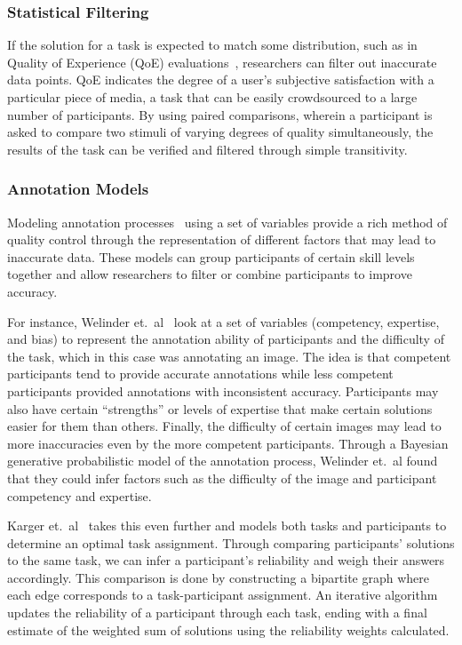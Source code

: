 \documentclass[10pt,twocolumn]{article}
\begin{document}
\subsubsection*{Statistical Filtering}
If the solution for a task is expected to match some distribution, 
such as in Quality of Experience (QoE) evaluations~\cite{Chen2009}, researchers 
can filter out inaccurate data points. QoE indicates the degree of a user's 
subjective satisfaction with a particular piece of media, a task 
that can be easily crowdsourced to a large number of participants. By using
paired comparisons, wherein a participant is asked to compare two 
stimuli of varying degrees of quality simultaneously, the results of the task 
can be verified and filtered through simple transitivity.


\subsubsection*{Annotation Models}

Modeling annotation processes~\cite{Karger,Welinder} using a set of variables 
provide a rich method of quality control through the representation of 
different factors that may lead to inaccurate data. These models can 
group participants of certain skill levels together and allow researchers to
filter or combine participants to improve accuracy.

For instance, Welinder et.\ al~\cite{Welinder} look at a set of variables
(competency, expertise, and bias) to represent the annotation ability of
participants and the difficulty of the task, which in this case was
annotating an image. The idea is that competent participants tend to provide
accurate annotations while less competent participants provided 
annotations with inconsistent accuracy. Participants may also have 
certain ``strengths'' or levels of expertise that make certain solutions
easier for them than others. Finally, the difficulty of certain images
may lead to more inaccuracies even by the more competent participants.
Through a Bayesian generative probabilistic model of the annotation process,
Welinder et.\ al found that they could infer factors such as the difficulty
of the image and participant competency and expertise.


Karger et.\ al~\cite{Karger} takes this even further and models both tasks 
and participants to determine an optimal task assignment. Through comparing 
participants' solutions to the same task, we can infer a participant's 
reliability and weigh their answers accordingly. This comparison is done
by constructing a bipartite graph where each edge corresponds to a 
task-participant assignment. An iterative algorithm updates the 
reliability of a participant through each task, ending with a final
estimate of the weighted sum of solutions using the reliability weights
calculated.
\end{document}

